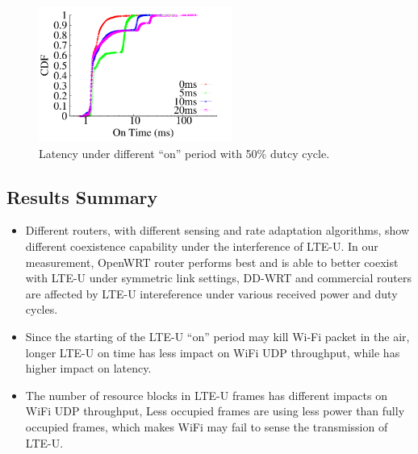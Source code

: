 \begin{figure}[!ht]
 \centering
    \includegraphics[width=2.5in]{./figures/impact_latency_ontime}
 \caption{Latency under different ``on'' period with 50\% dutcy cycle.}
  \label{fig:impact_latency}
\end{figure}


\subsection {Results Summary}

\begin{itemize}

\item Different routers, with different sensing and 
rate adaptation algorithms, show different coexistence 
capability under the interference of LTE-U. 
In our measurement, OpenWRT router performs best and is able
to better coexist with LTE-U under symmetric link settings, 
DD-WRT and commercial routers are affected by LTE-U
intereference under various received power and duty cycles. 
 

\item Since the starting of the LTE-U ``on'' period may kill Wi-Fi packet 
  in the air, longer LTE-U on time has less impact on WiFi UDP throughput, while
has higher impact on latency.  


\item The number of resource blocks in LTE-U frames has different impacts on WiFi UDP throughput, 
Less occupied frames are using less power than fully occupied frames, 
which makes WiFi may fail to sense the transmission of LTE-U. 


\end{itemize}





